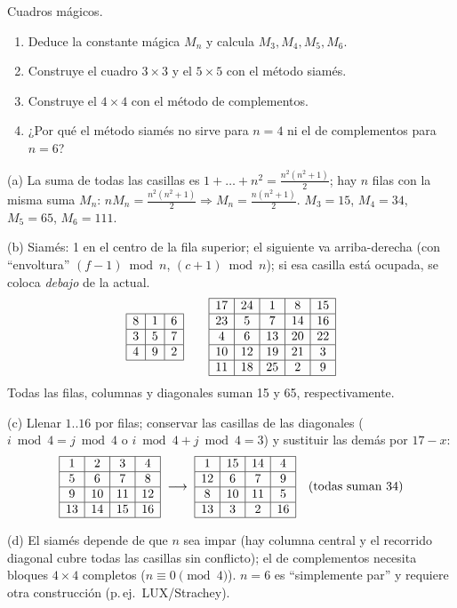 \begin{prob}
Cuadros mágicos.
\begin{enumerate}[label=(\alph*)]
\item Deduce la constante mágica $M_n$ y calcula $M_3, M_4, M_5, M_6$.
\item Construye el cuadro $3\times3$ y el $5\times5$ con el método siamés.
\item Construye el $4\times4$ con el método de complementos.
\item ¿Por qué el método siamés no sirve para $n=4$ ni el de complementos para $n=6$?
\end{enumerate}
\end{prob}
\begin{sol}
(a) La suma de todas las casillas es $1+\dots+n^2=\frac{n^2(n^2+1)}{2}$; hay $n$ filas con la misma suma $M_n$: $nM_n=\frac{n^2(n^2+1)}{2}\Rightarrow M_n=\frac{n(n^2+1)}{2}$. $M_3=15$, $M_4=34$, $M_5=65$, $M_6=111$.

(b) Siamés: 1 en el centro de la fila superior; el siguiente va arriba-derecha (con ``envoltura'' $(f-1)\bmod n$, $(c+1)\bmod n$); si esa casilla está ocupada, se coloca \emph{debajo} de la actual.
\[
\begin{array}{|c|c|c|}\hline 8&1&6\\\hline 3&5&7\\\hline 4&9&2\\\hline\end{array}
\qquad
\begin{array}{|c|c|c|c|c|}\hline 17&24&1&8&15\\\hline 23&5&7&14&16\\\hline 4&6&13&20&22\\\hline 10&12&19&21&3\\\hline 11&18&25&2&9\\\hline\end{array}
\]
Todas las filas, columnas y diagonales suman 15 y 65, respectivamente.

(c) Llenar $1..16$ por filas; conservar las casillas de las diagonales ($i\bmod4=j\bmod4$ o $i\bmod 4+j\bmod4=3$) y sustituir las demás por $17-x$:
\[
\begin{array}{|c|c|c|c|}\hline 1&2&3&4\\\hline 5&6&7&8\\\hline 9&10&11&12\\\hline 13&14&15&16\\\hline\end{array}
\;\longrightarrow\;
\begin{array}{|c|c|c|c|}\hline 1&15&14&4\\\hline 12&6&7&9\\\hline 8&10&11&5\\\hline 13&3&2&16\\\hline\end{array}
\quad(\text{todas suman }34)
\]

(d) El siamés depende de que $n$ sea impar (hay columna central y el recorrido diagonal cubre todas las casillas sin conflicto); el de complementos necesita bloques $4\times4$ completos ($n\equiv0\pmod4$). $n=6$ es ``simplemente par'' y requiere otra construcción (p.\,ej.\ LUX/Strachey).
\end{sol}

